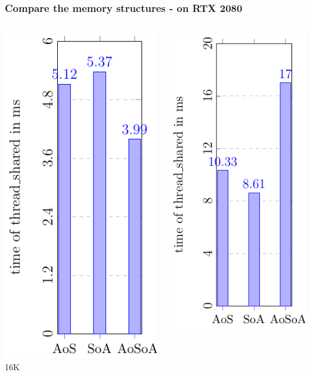 \documentclass[aspectratio=169]{beamer}
\begin{document}
\begin{frame}
\end{frame}


\begin{frame}
	\frametitle{Compare the memory structures - on RTX 2080}
	\begin{columns}
	\begin{column}{0.25\textwidth}
	\includegraphics[scale=0.55]{figures/fig1000.pdf}
	\small 16K
	\end{column}
	\begin{column}{0.25\textwidth}
	\includegraphics[scale=0.55]{figures/fig2000.pdf}

\end{column}
\end{columns}
\end{frame}
\end{document}
